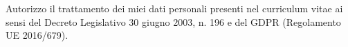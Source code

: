 \documentclass[%
               doublesided,
               paper=a4,
               fontsize=10pt
              ]{Rubini-Mattia-resume}
\begin{document}



\vspace*{\fill}
Autorizzo il trattamento dei miei dati personali presenti nel curriculum vitae ai sensi del Decreto Legislativo 30 giugno 2003, n. 196 e del GDPR (Regolamento UE 2016/679).
\end{document}
